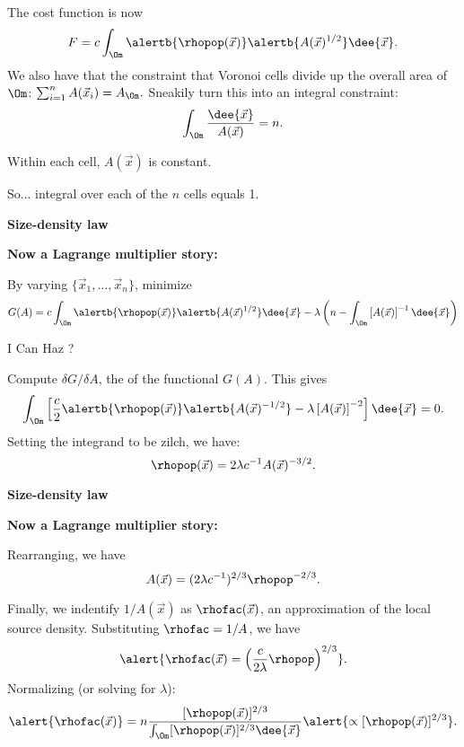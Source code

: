      The cost function is now
      $$
      F
      =
      c \int_{\Om}
      \alertb{\rhopop(\vec{x})}
      \alertb{ A(\vec{x})^{1/2}}
      \dee{\vec{x}}.
      $$
     We also have that the \alert{constraint} that
      Voronoi cells divide up the overall area
      of $\Om$:
      $
      \sum_{i=1}^{n} A(\vec{x}_i) = A_\Om.
      $
     Sneakily turn this into an integral constraint:
      $$
      \int_\Om
      \frac{\dee{\vec{x}}}
      {A(\vec{x})}
      = n.
      $$
    
      Within each cell, $A(\vec{x})$ is constant.
    
      So... integral over each of the $n$ cells equals 1.
    
  


  \textbf{Size-density law}

  \textbf{Now a Lagrange multiplier story:}
    
     By varying $\{\vec{x}_1,...,\vec{x}_n\}$, minimize
      $$
      G(A) = 
      c \int_{\Om}
      \alertb{\rhopop(\vec{x})}
      \alertb{ A(\vec{x})^{1/2}}
      \dee{\vec{x}}
      -
      \lambda
      \left(n -
        \int_\Om
        \left[A(\vec{x})\right]^{-1}
        \dee{\vec{x}}
      \right)
      $$
    
      I Can Haz
      ?
    
      Compute
      $\delta G / \delta A$,
      the 
      of the functional $G(A)$.
     This gives
      $$
      \int_{\Om}
      \left[
        \frac{c}{2} \alertb{\rhopop(\vec{x})}
        \alertb{ A(\vec{x})^{-1/2}}
        -
        \lambda
        \left[A(\vec{x})\right]^{-2}
      \right]
      \dee{\vec{x}} = 0.
      $$
     Setting the integrand to be zilch, we have:
      $$
      \rhopop(\vec{x})
      =
      2\lambda
      c^{-1}
      A(\vec{x})^{-3/2}.
      $$
    
  



  \textbf{Size-density law}

  \textbf{Now a Lagrange multiplier story:}
    
     Rearranging, we have
      $$
      A(\vec{x}) = (2{\lambda} c^{-1})^{2/3} \rhopop^{-2/3}.
      $$
    
      Finally, we indentify $1/A(\vec{x})$ as $\rhofac(\vec{x})$,
      an approximation of the local source density.
     Substituting $\rhofac=1/A$, we have
      $$
      \alert{\rhofac(\vec{x})
      = \left( 
        \frac{c}{2{\lambda}}
        \rhopop
    \right)^{2/3}}.
      $$
     Normalizing (or solving for $\lambda$):
      $$
      \alert{\rhofac(\vec{x})}
      =  n 
      \frac{[\rhopop(\vec{x})]^{2/3}}
      {\int_{\Om} [\rhopop(\vec{x})]^{2/3} \dee{\vec{x}}}
      \alert{\propto [\rhopop(\vec{x})]^{2/3}}.
      $$
    
